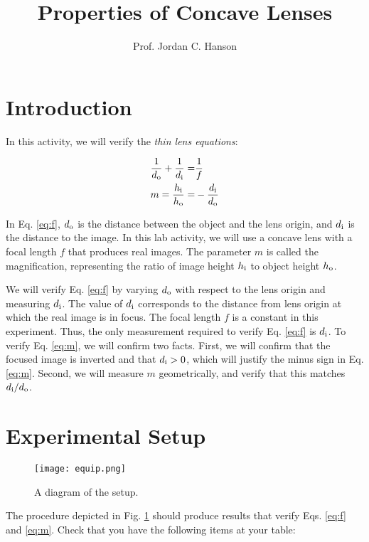 \documentclass[12pt,twocolumn]{article}
\title{Properties of Concave Lenses}
\author{Prof. Jordan C. Hanson}
\begin{document}
\small
\maketitle

\section{Introduction}

\noindent
In this activity, we will verify the \textit{thin lens equations}:

\begin{align}
\frac{1}{d_{\rm o}} + \frac{1}{d_{\rm i}} =& \frac{1}{f} \label{eq:f} \\
m = \frac{h_{\rm i}}{h_{\rm o}} =& -\frac{d_{\rm i}}{d_{\rm o}}  \label{eq:m}
\end{align}

In Eq. \ref{eq:f}, $d_{\rm o}$ is the distance between the object and the lens origin, and $d_{\rm i}$ is the distance to the image.  In this lab activity, we will use a concave lens with a focal length $f$ that produces real images.  The parameter $m$ is called the magnification, representing the ratio of image height $h_{\rm i}$ to object height $h_{\rm o}$.

We will verify Eq. \ref{eq:f} by varying $d_{\rm o}$ with respect to the lens origin and measuring $d_{\rm i}$.  The value of $d_{\rm i}$ corresponds to the distance from lens origin at which the real image is in focus. The focal length $f$ is a constant in this experiment.  Thus, the only measurement required to verify Eq. \ref{eq:f} is $d_{\rm i}$.  To verify Eq. \ref{eq:m}, we will confirm two facts.  First, we will confirm that the focused image is inverted and that $d_{\rm i}>0$, which will justify the minus sign in Eq. \ref{eq:m}.  Second, we will measure $m$ geometrically, and verify that this matches $d_{\rm i}/d_{\rm o}$.

\section{Experimental Setup}

\begin{figure}[ht]
\centering
\texttt{[image: equip.png]}
\caption{\label{fig:equip} A diagram of the setup.}
\end{figure}

\noindent
The procedure depicted in Fig. \ref{fig:equip} should produce results that verify Eqs. \ref{eq:f} and \ref{eq:m}.  Check that you have the following items at your table:
\end{document}
